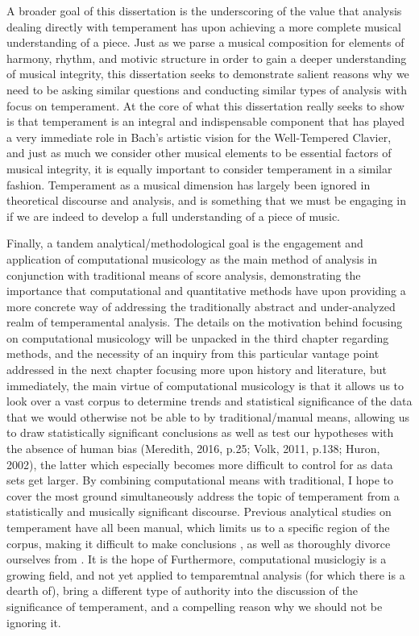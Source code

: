 A broader goal of this dissertation is the underscoring of the value
that analysis dealing directly with temperament has upon achieving a
more complete musical understanding of a piece. Just as we parse a
musical composition for elements of harmony, rhythm, and motivic
structure in order to gain a deeper understanding of musical integrity,
this dissertation seeks to demonstrate salient reasons why we need to be
asking similar questions and conducting similar types of analysis with
focus on temperament. At the core of what this dissertation really seeks
to show is that temperament is an integral and indispensable component
that has played a very immediate role in Bach's artistic vision for the
Well-Tempered Clavier, and just as much we consider other musical
elements to be essential factors of musical integrity, it is equally
important to consider temperament in a similar fashion. Temperament as a
musical dimension has largely been ignored in theoretical discourse and
analysis, and is something that we must be engaging in if we are indeed
to develop a full understanding of a piece of music.

Finally, a tandem analytical/methodological goal is the engagement and
application of computational musicology as the main method of analysis
in conjunction with traditional means of score analysis, demonstrating
the importance that computational and quantitative methods have upon
providing a more concrete way of addressing the traditionally abstract
and under-analyzed realm of temperamental analysis. The details on the
motivation behind focusing on computational musicology will be unpacked
in the third chapter regarding methods, and the necessity of an inquiry
from this particular vantage point addressed in the next chapter
focusing more upon history and literature, but immediately, the main
virtue of computational musicology is that it allows us to look over a
vast corpus to determine trends and statistical significance of the data
that we would otherwise not be able to by traditional/manual means,
allowing us to draw statistically significant conclusions as well as
test our hypotheses with the absence of human bias (Meredith, 2016,
p.25; Volk, 2011, p.138; Huron, 2002), the latter which especially
becomes more difficult to control for as data sets get larger. By
combining computational means with traditional, I hope to cover the most
ground simultaneously address the topic of temperament from a
statistically and musically significant discourse. Previous analytical
studies on temperament have all been manual, which limits us to a
specific region of the corpus, making it difficult to make conclusions ,
as well as thoroughly divorce ourselves from . It is the hope of
Furthermore, computational musiclogiy is a growing field, and not yet
applied to temparemtnal analysis (for which there is a dearth of), bring
a different type of authority into the discussion of the significance of
temperament, and a compelling reason why we should not be ignoring it.

